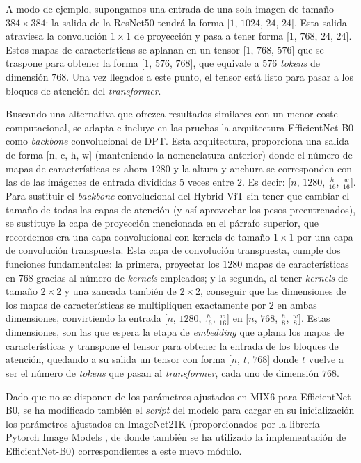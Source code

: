 A modo de ejemplo, supongamos una entrada de una sola imagen de tamaño $384\times384$: la salida de la ResNet50 tendrá la forma [$1$, $1024$, $24$, $24$]. Esta salida atraviesa la convolución $1\times1$ de proyección y pasa a tener forma [$1$, $768$, $24$, $24$]. Estos mapas de características se aplanan en un tensor [$1$, $768$, $576$] que se traspone para obtener la forma [$1$, $576$, $768$], que equivale a $576$ \textit{tokens} de dimensión $768$. Una vez llegados a este punto, el tensor está listo para pasar a los bloques de atención del \textit{transformer}.

Buscando una alternativa que ofrezca resultados similares con un menor coste computacional, se adapta e incluye en las pruebas la arquitectura EfficientNet-B0 como \textit{backbone} convolucional de DPT. Esta arquitectura, proporciona una salida de forma [n, c, h, w] (manteniendo la nomenclatura anterior) donde el número de mapas de características es ahora $1280$ y la altura y anchura se corresponden con las de las imágenes de entrada divididas 5 veces entre 2. Es decir: [$n$, $1280$, $\frac{h}{16}$, $\frac{w}{16}$]. Para sustituir el \textit{backbone} convolucional del Hybrid ViT sin tener que cambiar el tamaño de todas las capas de atención (y así aprovechar los pesos preentrenados), se sustituye la capa de proyección mencionada en el párrafo superior, que recordemos era una capa convolucional con kernels de tamaño $1\times1$ por una capa de convolución transpuesta. Esta capa de convolución transpuesta, cumple dos funciones fundamentales: la primera, proyectar los $1280$ mapas de características en $768$ gracias al número de \textit{kernels} empleados; y la segunda, al tener \textit{kernels} de tamaño $2\times2$ y una zancada también de $2\times2$, conseguir que las dimensiones de los mapas de características se multipliquen exactamente por $2$ en ambas dimensiones, convirtiendo la entrada [$n$, $1280$, $\frac{h}{16}$, $\frac{w}{16}$] en [$n$, $768$, $\frac{h}{8}$, $\frac{w}{8}$]. Estas dimensiones, son las que espera la etapa de \textit{embedding} que aplana los mapas de características y transpone el tensor para obtener la entrada de los bloques de atención, quedando a su salida un tensor con forma [$n$, $t$, $768$] donde $t$ vuelve a ser el número de \textit{tokens} que pasan al \textit{transformer}, cada uno de dimensión $768$.

Dado que no se disponen de los parámetros ajustados en MIX6 para EfficientNet-B0, se ha modificado también el \textit{script} del modelo para cargar en su inicialización los parámetros ajustados en ImageNet21K (proporcionados por la librería Pytorch Image Models \cite{timm}, de donde también se ha utilizado la implementación de EfficientNet-B0) correspondientes a este nuevo módulo. 


